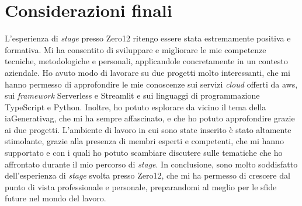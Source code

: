 \section{Considerazioni finali}
L'esperienza di \textit{stage} presso Zero12 ritengo essere stata estremamente positiva e formativa. Mi ha consentito di sviluppare e migliorare le mie competenze tecniche, metodologiche e personali, applicandole concretamente in un contesto aziendale. Ho avuto modo di lavorare su due progetti molto interessanti, che mi hanno permesso di approfondire le mie conoscenze sui servizi \textit{cloud} offerti da \gls{aws}, sui \textit{framework} Serverless e Streamlit e sui linguaggi di programmazione TypeScript e Python. Inoltre, ho potuto esplorare da vicino il tema della \gls{iaGenerativag}, che mi ha sempre affascinato, e che ho potuto approfondire grazie ai due progetti. L'ambiente di lavoro in cui sono state inserito è stato altamente stimolante, grazie alla presenza di membri esperti e competenti, che mi hanno supportato e con i quali ho potuto scambiare discutere sulle tematiche che ho affrontato durante il mio percorso di \textit{stage}.
In conclusione, sono molto soddisfatto dell'esperienza di \textit{stage} svolta presso Zero12, che mi ha permesso di crescere dal punto di vista professionale e personale, preparandomi al meglio per le sfide future nel mondo del lavoro.